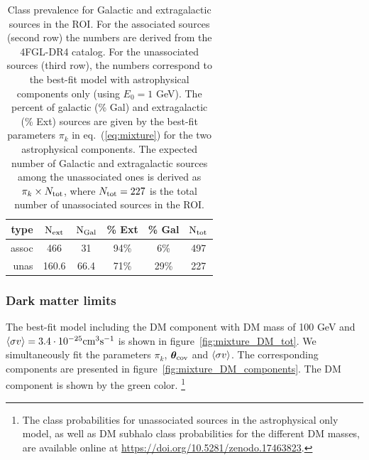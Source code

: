 \begin{table}[t]
\centering
\begin{tabular}{|rccccc|}
\toprule
type & $\rm N_{ext}$ & $\rm N_{Gal}$ & \% Ext & \% Gal & $\rm N_{tot}$\\
\midrule
assoc & 466 & 31 & 94\% & 6\% & 497\\
unas & 160.6 & 66.4 & 71\% & 29\% & 227\\
\bottomrule
\end{tabular}
\caption{Class prevalence for Galactic and extragalactic sources in the ROI. 
For the associated sources (second row) the numbers are derived from the 4FGL-DR4 catalog. 
For the unassociated sources (third row), the numbers correspond to the best-fit model with astrophysical components only (using $E_0 = 1$ GeV). 
The percent of galactic (\% Gal) and extragalactic (\% Ext) sources are given by the best-fit parameters $\pi_k$ in eq.~(\ref{eq:mixture}) for the two astrophysical components.
The expected number of Galactic and extragalactic sources among the unassociated ones is derived as $\pi_k \times N_{\rm tot}$, where $N_{\rm tot} = 227$ is the total number of unassociated sources in the ROI.
}
\label{tab:class_prevalence_astro}
\end{table}


\subsubsection{Dark matter limits}
\label{sec:dm-limits}

The best-fit model including the DM component with DM mass of 100 GeV and $\langle \sigma v \rangle=3.4 \cdot 10^{-25} {\rm cm}^3{\rm s}^{-1}$ is shown in figure~\ref{fig:mixture_DM_tot}.
We simultaneously fit the parameters $\pi_k$, $\boldsymbol{\theta}_{\rm cov}$ and $\langle \sigma v \rangle$.
The corresponding components are presented in figure~\ref{fig:mixture_DM_components}.
The DM component is shown by the green color.%
\footnote{The class probabilities for unassociated sources in the astrophysical only model, as well as DM subhalo class probabilities for the different DM masses, are available online at \href{https://doi.org/10.5281/zenodo.17463823}{https://doi.org/10.5281/zenodo.17463823}.
}


